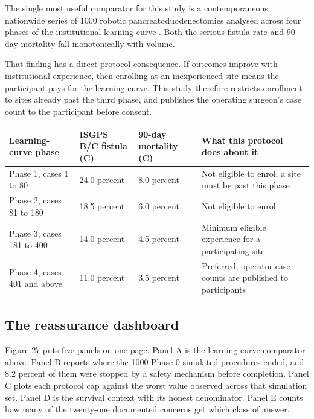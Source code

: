 The single most useful comparator for this study is a contemporaneous nationwide
series of 1000 robotic pancreatoduodenectomies analysed across four phases of
the institutional learning curve \cite{DutchCohort2025}. Both the serious
fistula rate and 90-day mortality fall monotonically with volume.

That finding has a direct protocol consequence. If outcomes improve with
institutional experience, then enrolling at an inexperienced site means the
participant pays for the learning curve. This study therefore restricts
enrollment to sites already past the third phase, and publishes the operating
surgeon's case count to the participant before consent.

\vspace{0.30em}

\noindent\begin{tabularx}{\textwidth}{L{3.6cm} C{2.5cm} C{2.4cm} Y}
\toprule
\textbf{Learning-curve phase} & \textbf{ISGPS B/C fistula (C)} & \textbf{90-day mortality (C)} & \textbf{What this protocol does about it} \\
\midrule
Phase 1, cases 1 to 80 & 24.0 percent & 8.0 percent & Not eligible to enrol; a site must be past this phase \\
Phase 2, cases 81 to 180 & 18.5 percent & 6.0 percent & Not eligible to enrol \\
Phase 3, cases 181 to 400 & 14.0 percent & 4.5 percent & Minimum eligible experience for a participating site \\
Phase 4, cases 401 and above & 11.0 percent & 3.5 percent & Preferred; operator case counts are published to participants \\
\bottomrule
\end{tabularx}

\vspace{0.30em}

\subsection{The reassurance dashboard}

Figure 27 puts five panels on one page. Panel A is the learning-curve
comparator above. Panel B reports where the 1000 Phase 0 simulated procedures
ended, and 8.2 percent of them were stopped by a safety mechanism before
completion. Panel C plots each protocol cap against the worst value observed
across that simulation set. Panel D is the survival context with its honest
denominator. Panel E counts how many of the twenty-one documented concerns get
which class of answer.

